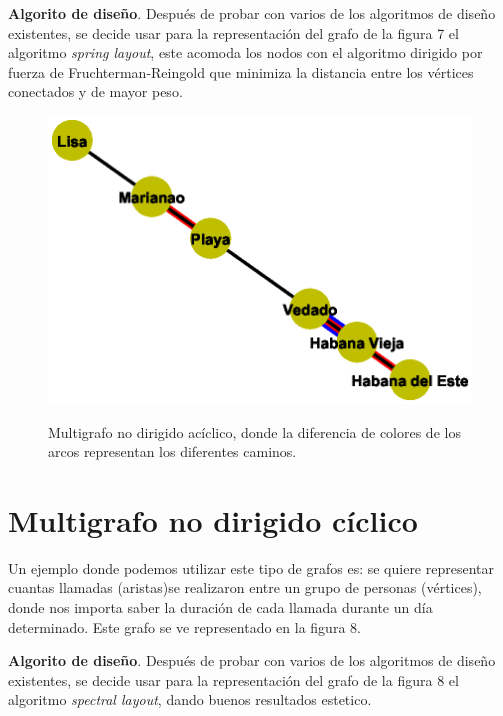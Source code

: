 \documentclass{article}
\begin{document}
\textbf{Algorito de diseño}.
Después de probar con varios de los algoritmos de diseño existentes, se decide usar para la representación del grafo de la figura 7 el algoritmo \textit{spring layout}, este acomoda los nodos con el algoritmo dirigido por fuerza de Fruchterman-Reingold que minimiza la distancia entre los vértices conectados y de mayor peso.
\begin{center}

\end{center}
\begin{figure}[h]
\begin{center}
\includegraphics[scale=0.7]{Graf7_spring_layout.eps}\\
\caption{Multigrafo no dirigido acíclico, donde la diferencia de colores de los arcos representan los diferentes caminos.}
\end{center}
\end{figure}
\section{Multigrafo no dirigido cíclico}

Un ejemplo donde podemos utilizar este tipo de grafos es: se quiere representar cuantas llamadas (aristas)se realizaron entre un grupo de personas (vértices), donde nos importa saber la duración de cada llamada durante un día determinado. Este grafo se ve representado en la figura 8.

\textbf{Algorito de diseño}.
Después de probar con varios de los algoritmos de diseño existentes, se decide usar para la representación del grafo de la figura 8 el algoritmo \textit{spectral layout}, dando buenos resultados estetico.
\end{document}
